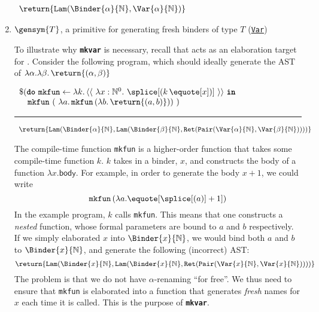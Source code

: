\begin{enumerate}
\begin{core}
\textcolor{coreComment}{$\begin{array}{l}\return{\texttt{Lam}(\Binder{\alpha}{\mathbb{N}}, \Var{\alpha}{\mathbb{N}})}\end{array}$}
\end{core}

\item $\gensym{T}$, a primitive for generating fresh binders of type $T$ (\underline{\texttt{Var}})

To illustrate why \textbf{\texttt{mkvar}} is necessary, recall that \coreLang{} acts as an elaboration target for \sourceLang{}. Consider the following \sourceLang{} program, which should ideally generate the AST of $\lambda \alpha. \lambda \beta. \, \return{(\alpha, \beta)}$

\begin{source}
$\begin{array}{l}
\$(\textbf{\texttt{do}} \, \, \texttt{mkfun} \leftarrow {\lambda k. \, {\langle\langle\,\, \lambda x: \mathbb{N}^0. \,\, \splice[(k \, {\equote[x]})]\,\, \rangle\rangle}} \, \, \textbf{\texttt{in}} \\
\quad \texttt{mkfun} \,\, (\,\, \lambda a. \, \texttt{mkfun} \, (\lambda b. \, \return{(a, b)})) \,\, )
\end{array}$

\vspace{2mm} 
\textcolor{sourceComment}{\hrule height 0.2mm \relax}
\vspace{2mm} 

\textcolor{sourceComment}{$\begin{array}{l}\return{\texttt{Lam}(\Binder{\alpha}{\mathbb{N}}, \texttt{Lam}(\Binder{\beta}{\mathbb{N}}, \texttt{Ret}(\texttt{Pair}(\Var{\alpha}{\mathbb{N}}, \Var{\beta}{\mathbb{N}}))))}\end{array}$}
\end{source}

The compile-time function \texttt{mkfun} is a higher-order function that takes some compile-time function $k$. $k$ takes in a binder, $x$, and constructs the \textsf{body} of a function $\lambda x. \textsf{body}$. For example, in order to generate the body $x + 1$, we could write 
\[\texttt{mkfun} \,  (\lambda a. \equote[{\splice[(a)]} + 1]) \]
In the example \sourceLang{} program, $k$ calls \texttt{mkfun}. This means that one constructs a \textit{nested} function, whose formal parameters are bound to $a$ and $b$ respectively. If we simply elaborated $x$ into $\Binder{x}{\mathbb{N}}$, we would bind both $a$ and $b$ to $\Binder{x}{\mathbb{N}}$, and generate the following (incorrect) AST: 
 \[\return{\texttt{Lam}(\Binder{x}{\mathbb{N}}, \texttt{Lam}(\Binder{x}{\mathbb{N}}, \texttt{Ret}(\texttt{Pair}(\Var{x}{\mathbb{N}}, \Var{x}{\mathbb{N}}))))}\]
 The problem is that we do not have $\alpha$-renaming ``for free''. We thus need to ensure that \texttt{mkfun} is elaborated into a function that generates \textit{fresh} names for $x$ each time it is called. This is the purpose of \textbf{\texttt{mkvar}}. 
\end{enumerate}

